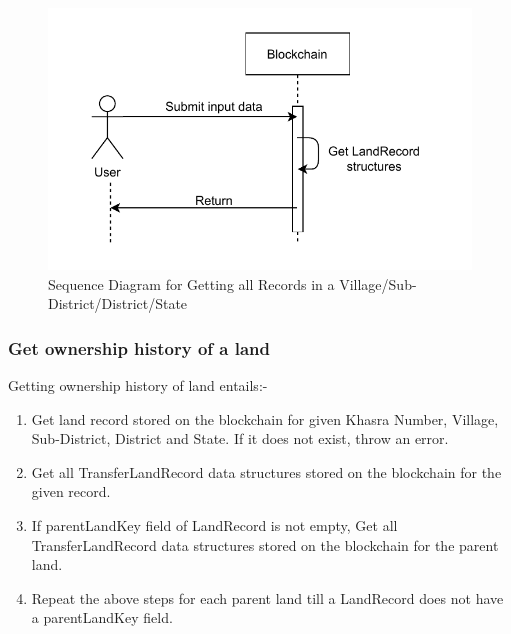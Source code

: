 \documentclass{article}
\begin{document}
        \begin{figure}[htbp]
            \includegraphics[scale=0.25]{blockchain_seq_get_records}
            \centering
            \caption{Sequence Diagram for Getting all Records in a Village/Sub-District/District/State}
        \end{figure}


    \subsubsection{Get ownership history of a land}
        Getting ownership history of land entails:-
        \begin{enumerate}
            \item Get land record stored on the blockchain for given Khasra Number, Village, Sub-District, District and State. If it does not exist, throw an error.
            \item Get all TransferLandRecord data structures stored on the blockchain for the given record.
            \item If parentLandKey field of LandRecord is not empty, Get all TransferLandRecord data structures stored on the blockchain for the parent land.
            \item Repeat the above steps for each parent land till a LandRecord does not have a parentLandKey field. 
        \end{enumerate}
\end{document}

